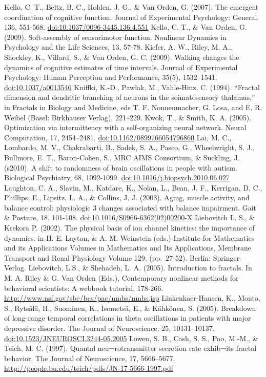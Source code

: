 \documentclass[12pt,]{book}
\begin{document}
Kello, C. T., Beltz, B. C., Holden, J. G., \& Van Orden, G. (2007). The emergent coordination of cognitive function. Journal of Experimental Psychology: General, 136, 551-568. \url{doi:10.1037/0096-3445.136.4.551}
Kello, C. T., \& Van Orden, G. (2009). Soft-assembly of sensorimotor function. Nonlinear Dynamics in Psychology and the Life Sciences, 13, 57-78.
Kiefer, A. W., Riley, M. A., Shockley, K., Villard, S., \& Van Orden, G. C. (2009). Walking changes the dynamics of cognitive estimates of time intervals. Journal of Experimental Psychology: Human Perception and Performance, 35(5), 1532--1541. \url{doi:10.1037/a0013546}
Kniffki, K.-D., Pawlak, M., Vahle-Hinz, C. (1994). ``Fractal dimension and dendritic branching of neurons in the soimatosensory thalamus,'' in Fractals in Biology and Medicine, eds T. F. Nonnenmacher, G. Losa, and E. R. Weibel (Basel: Birkhauser Verlag), 221--229.
Kwok, T., \& Smith, K. A. (2005). Optimization via intermittency with a self-organizing neural network. Neural Computation, 17, 2454--2481. \url{doi:10.1162/0899766054796860}
Lai, M. C., Lombardo, M. V., Chakrabarti, B., Sadek, S. A., Pasco, G., Wheelwright, S. J., Bullmore, E. T., Baron-Cohen, S., MRC AIMS Consortium, \& Suckling, J. (s2010). A shift to randomness of brain oscillations in people with autism. Biological Psychiatry, 68, 1092-1099. \url{doi:10.1016/j.biopsych.2010.06.027}
Laughton, C. A., Slavin, M., Katdare, K., Nolan, L., Bean, J. F., Kerrigan, D. C., Phillips, E., Lipsitz, L. A., \& Collins, J. J. (2003). Aging, muscle activity, and balance control: physiologic 3 changes associated with balance impairment. Gait \& Posture, 18, 101-108. \url{doi:10.1016/S0966-6362(02)00200-X}
Liebovitch L. S., \& Krekora P. (2002). The physical basis of ion channel kinetics: the importance of dynamics. in H. E. Layton, \& A. M. Weinstein (eds.) Institute for Mathematics and its Applications Volumes in Mathematics and Its Applications, Membrane Transport and Renal Physiology Volume 129, (pp.~27-52). Berlin: Springer-Verlag.
Liebovitch, L.S., \& Shehadeh, L. A. (2005). Introduction to fractals. In M. A. Riley \& G. Van Orden (Eds.), Contemporary nonlinear methods for behavioral scientists: A webbook tutorial, 178-266. \url{http://www.nsf.gov/sbe/bcs/pac/nmbs/nmbs.jsp}
Linkenkaer-Hansen, K., Monto, S., Rytsälä, H., Suominen, K., Isometsä, E., \& Kähkönen, S. (2005). Breakdown of long-range temporal correlations in theta oscillations in patients with major depressive disorder. The Journal of Neuroscience, 25, 10131--10137. \url{doi:10.1523/JNEUROSCI.3244-05.2005}
Lowen, S. B., Cash, S. S., Poo, M.-M., \& Teich, M. C. (1997). Quantal neu¬rotransmitter secretion rate exhib¬its fractal behavior. The Journal of Neuroscience, 17, 5666--5677. \url{http://people.bu.edu/teich/pdfs/JN-17-5666-1997.pdf}
\end{document}
